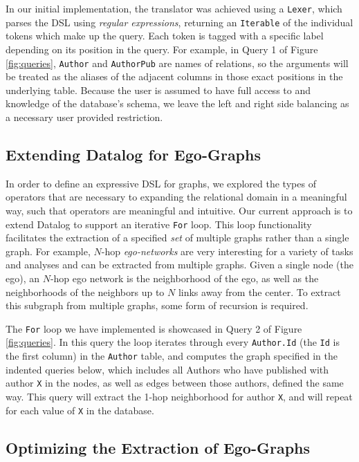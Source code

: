 \documentclass[11pt,letterpaper]{article}
\begin{document}
In our initial implementation, the translator was achieved using a \texttt{Lexer}, which parses the DSL using \textit{regular expressions}, returning an \texttt{Iterable} of the individual tokens which make up the query. Each token is tagged with a specific label depending on its position in the query. For example, in Query 1 of Figure \ref{fig:queries}, \texttt{Author} and \texttt{AuthorPub} are names of relations, so the arguments will be treated as the aliases of the adjacent columns in those exact positions in the underlying table. Because the user is assumed to have full access to and knowledge of the database's schema, we leave the left and right side balancing as a necessary user provided restriction.

\subsection*{Extending Datalog for Ego-Graphs}

In order to define an expressive DSL for graphs, we explored the types of operators that are necessary to expanding the relational domain in a meaningful way, such that operators are meaningful and intuitive. Our current approach is to extend Datalog to support an iterative \texttt{For} loop. This loop functionality facilitates the extraction of a specified \textit{set} of multiple graphs rather than a single graph. For example, $N$-hop \textit{ego-networks} are very interesting for a variety of tasks and analyses and can be extracted from multiple graphs. Given a single node (the ego), an $N$-hop ego network is the neighborhood of the ego, as well as the neighborhoods of the neighbors up to $N$ links away from the center. To extract this subgraph from multiple graphs, some form of recursion is required.

The \texttt{For} loop we have implemented is showcased in Query 2 of Figure \ref{fig:queries}. In this query the loop iterates through every \texttt{Author.Id} (the \texttt{Id} is the first column) in the \texttt{Author} table, and computes the graph specified in the indented queries below, which includes all Authors who have published with author \texttt{X} in the nodes, as well as edges between those authors, defined the same way. This query will extract the 1-hop neighborhood for author \texttt{X}, and will repeat for each value of \texttt{X} in the database.

\subsection*{Optimizing the Extraction of Ego-Graphs}
\end{document}
